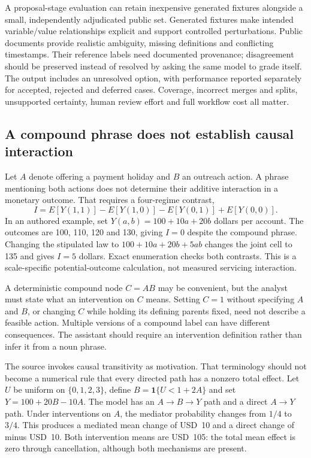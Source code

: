 A proposal-stage evaluation can retain inexpensive generated fixtures alongside a small, independently adjudicated public set. Generated fixtures make intended variable/value relationships explicit and support controlled perturbations. Public documents provide realistic ambiguity, missing definitions and conflicting timestamps. Their reference labels need documented provenance; disagreement should be preserved instead of resolved by asking the same model to grade itself. The output includes an unresolved option, with performance reported separately for accepted, rejected and deferred cases. Coverage, incorrect merges and splits, unsupported certainty, human review effort and full workflow cost all matter.

\subsection{A compound phrase does not establish causal interaction}

Let $A$ denote offering a payment holiday and $B$ an outreach action. A phrase mentioning both actions does not determine their additive interaction in a monetary outcome. That requires a four-regime contrast,
\begin{equation}
 I=E[Y(1,1)]-E[Y(1,0)]-E[Y(0,1)]+E[Y(0,0)].
 \label{eq:exec28-cm-interaction}
\end{equation}
In an authored example, set $Y(a,b)=100+10a+20b$ dollars per account. The outcomes are 100, 110, 120 and 130, giving $I=0$ despite the compound phrase. Changing the stipulated law to $100+10a+20b+5ab$ changes the joint cell to 135 and gives $I=5$ dollars. Exact enumeration checks both contrasts. This is a scale-specific potential-outcome calculation, not measured servicing interaction.\citep{exec28_cm_reference}

A deterministic compound node $C=AB$ may be convenient, but the analyst must state what an intervention on $C$ means. Setting $C=1$ without specifying $A$ and $B$, or changing $C$ while holding its defining parents fixed, need not describe a feasible action. Multiple versions of a compound label can have different consequences. The assistant should require an intervention definition rather than infer it from a noun phrase.

The source invokes causal transitivity as motivation. That terminology should not become a numerical rule that every directed path has a nonzero total effect. Let $U$ be uniform on $\{0,1,2,3\}$, define $B=\mathbf 1\{U<1+2A\}$ and set $Y=100+20B-10A$. The model has an $A\to B\to Y$ path and a direct $A\to Y$ path. Under interventions on $A$, the mediator probability changes from $1/4$ to $3/4$. This produces a mediated mean change of USD~10 and a direct change of minus USD~10. Both intervention means are USD~105: the total mean effect is zero through cancellation, although both mechanisms are present.\citep{exec28_cm_reference}

